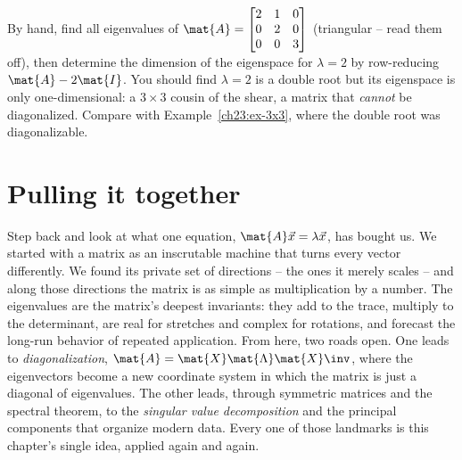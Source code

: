 \begin{labbox}
By hand, find all eigenvalues of
$\mat{A}=\begin{bmatrix}2 & 1 & 0\\ 0 & 2 & 0\\ 0 & 0 & 3\end{bmatrix}$
(triangular -- read them off), then determine the dimension of the eigenspace for
$\lambda=2$ by row-reducing $\mat{A}-2\mat{I}$. You should find $\lambda=2$ is a
double root but its eigenspace is only one-dimensional: a $3\times 3$ cousin of the
shear, a matrix that \emph{cannot} be diagonalized. Compare with
Example~\ref{ch23:ex-3x3}, where the double root was diagonalizable.
\end{labbox}

\section{Pulling it together}
\label{ch23:together}

\begin{aestheticbox}
Step back and look at what one equation, $\mat{A}\vec{x}=\lambda\vec{x}$, has
bought us. We started with a matrix as an inscrutable machine that turns every
vector differently. We found its private set of directions -- the ones it merely
scales -- and along those directions the matrix is as simple as multiplication by a
number. The eigenvalues are the matrix's deepest invariants: they add to the trace,
multiply to the determinant, are real for stretches and complex for rotations, and
forecast the long-run behavior of repeated application. From here, two roads open.
One leads to \emph{diagonalization}, $\mat{A}=\mat{X}\mat{\Lambda}\mat{X}\inv$,
where the eigenvectors become a new coordinate system in which the matrix is just a
diagonal of eigenvalues. The other leads, through symmetric matrices and the
spectral theorem, to the \emph{singular value decomposition} and the principal
components that organize modern data. Every one of those landmarks is this chapter's
single idea, applied again and again.
\end{aestheticbox}

